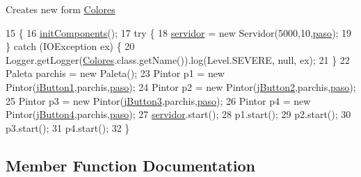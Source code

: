 Creates new form \mbox{\hyperlink{class_sockets_1_1_colores}{Colores}} 
\begin{DoxyCode}
15     \{
16         \mbox{\hyperlink{class_sockets_1_1_colores_aac354d879e1d011b0612ebaf0c312df9}{initComponents}}();
17         \textcolor{keywordflow}{try} \{
18             \mbox{\hyperlink{class_sockets_1_1_colores_a89813ab2c57db5af75da62b9419481f9}{servidor}} = \textcolor{keyword}{new} Servidor(5000,10,\mbox{\hyperlink{class_sockets_1_1_colores_adf9fafb3fd2b7cdd9e555b80d94df744}{paso}});
19         \} \textcolor{keywordflow}{catch} (IOException ex) \{
20             Logger.getLogger(\mbox{\hyperlink{class_sockets_1_1_colores_a1d4e4f3b911aef7557c9dacd277afd67}{Colores}}.class.getName()).log(Level.SEVERE, null, ex);
21         \}
22         Paleta parchis = \textcolor{keyword}{new} Paleta();
23         Pintor p1 = \textcolor{keyword}{new} Pintor(\mbox{\hyperlink{class_sockets_1_1_colores_ab40711ac8b3b4ea81488754689d89db6}{jButton1}},parchis,\mbox{\hyperlink{class_sockets_1_1_colores_adf9fafb3fd2b7cdd9e555b80d94df744}{paso}});
24         Pintor p2 = \textcolor{keyword}{new} Pintor(\mbox{\hyperlink{class_sockets_1_1_colores_a4f1d1e8c1b92fee9bca285f52bf66b84}{jButton2}},parchis,\mbox{\hyperlink{class_sockets_1_1_colores_adf9fafb3fd2b7cdd9e555b80d94df744}{paso}});
25         Pintor p3 = \textcolor{keyword}{new} Pintor(\mbox{\hyperlink{class_sockets_1_1_colores_a7bba899d5ca449162ba9e0b7b3ae4264}{jButton3}},parchis,\mbox{\hyperlink{class_sockets_1_1_colores_adf9fafb3fd2b7cdd9e555b80d94df744}{paso}});
26         Pintor p4 = \textcolor{keyword}{new} Pintor(\mbox{\hyperlink{class_sockets_1_1_colores_ac555b14a5e9aa5fd552356f04d884d31}{jButton4}},parchis,\mbox{\hyperlink{class_sockets_1_1_colores_adf9fafb3fd2b7cdd9e555b80d94df744}{paso}});
27         \mbox{\hyperlink{class_sockets_1_1_colores_a89813ab2c57db5af75da62b9419481f9}{servidor}}.start();
28         p1.start();
29         p2.start();
30         p3.start();
31         p4.start();
32     \}
\end{DoxyCode}


\subsection{Member Function Documentation}
\mbox{\label{class_sockets_1_1_colores_aac354d879e1d011b0612ebaf0c312df9}} 
